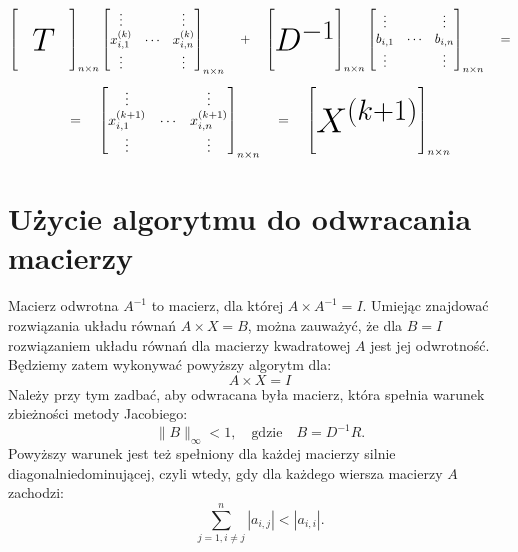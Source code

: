 \documentclass[a4paper,margin=1.54cm]{article}
\begin{document}
 \[
 \begin{bmatrix}
    \qquad\qquad \\
    \\
    \raisebox{0pt}[0pt][0pt]{\Huge $T$} \\
    \\
\end{bmatrix}_{n\times n}
 \begin{bmatrix}
    \vdots & & \vdots \\
     x^{(k)}_{i,1} & \cdots & x^{(k)}_{i,n}\\
    \vdots & & \vdots
\end{bmatrix}_{n\times n}
\quad + \quad
\begin{bmatrix}
    \qquad\qquad \\
    \\
    \raisebox{0pt}[0pt][0pt]{\Huge $D^{-1}$} \\
    \\
\end{bmatrix}_{n\times n}
 \begin{bmatrix}
    \vdots & & \vdots \\
     b_{i,1} & \cdots & b_{i,n}\\
    \vdots & & \vdots
\end{bmatrix}_{n\times n}
\quad = 
 \]
\[
=\quad
 \begin{bmatrix}
    \vdots & & \vdots \\
     x^{(k+1)}_{i,1} & \cdots & x^{(k+1)}_{i,n}\\
    \vdots & & \vdots
\end{bmatrix}_{n\times n}
\quad = \quad
\begin{bmatrix}
    \qquad\qquad \\
    \\
    \raisebox{0pt}[0pt][0pt]{\Huge $X^{(k+1)}$} \\
    \\
\end{bmatrix}_{n\times n}
 \]
 
\section{Użycie algorytmu do odwracania macierzy}
Macierz odwrotna $A^{-1}$ to macierz, dla której $A\times A^{-1} = I$.
Umiejąc \linebreak znajdować rozwiązania układu równań $A\times X = B$, można zauważyć, że dla $B=I$ rozwiązaniem układu równań dla macierzy kwadratowej $A$ jest jej odwrotność. Będziemy zatem wykonywać powyższy algorytm dla:
\[
A\times X = I
\]
Należy przy tym zadbać, aby odwracana była macierz, która spełnia warunek zbieżności metody Jacobiego:
\[
	\|B	\|_\infty < 1, \quad \textrm{gdzie} \quad B = D^{-1}R.
\]
Powyższy warunek jest też spełniony dla każdej macierzy silnie diagonalnie\linebreak dominującej, czyli wtedy, gdy dla każdego wiersza macierzy $A$ zachodzi:
\[
    \sum_{j=1, i\neq j}^n |a_{i,j}| < |a_{i,i}| \textrm{.}
\]
\end{document}
